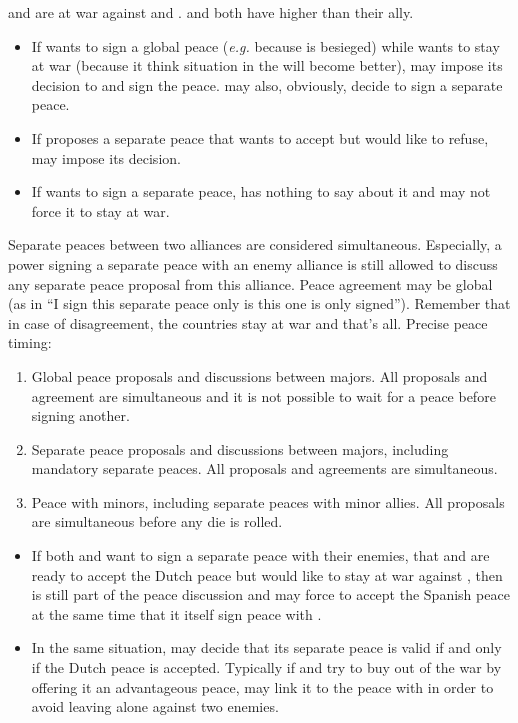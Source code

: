 \begin{exemple}[Disagreements]
  \FRA and \SPA are at war against \HOL and \ANG. \FRA and  \HOL both have
  higher \DIP than their ally.
  \begin{itemize}
  \item If \HOL wants to sign a global peace (\emph{e.g.} because
    \villeAmsterdam is besieged) while \ANG wants to stay at war (because it
    think situation in the \ROTW will become better), \HOL may impose its
    decision to \ANG and sign the peace. \HOL may also, obviously, decide to
    sign a separate peace.
  \item If \HOL proposes a separate peace that \FRA wants to accept but \HIS
    would like to refuse, \FRA may impose its decision.
  \item If \ANG wants to sign a separate peace, \HOL has nothing to say about
    it and may not force it to stay at war.
  \end{itemize}
\end{exemple}

Separate peaces between two alliances are considered simultaneous. Especially,
a power signing a separate peace with an enemy alliance is still allowed to
discuss any separate peace proposal from this alliance. Peace agreement may be
global (as in ``I sign this separate peace only is this one is only
signed''). Remember that in case of disagreement, the countries stay at war
and that's all.
\bparag Precise peace timing:
\begin{enumerate}
\item Global peace proposals and discussions between majors. All proposals and
  agreement are simultaneous and it is not possible to wait for a peace before
  signing another.
\item Separate peace proposals and discussions between majors, including
  mandatory separate peaces. All proposals and agreements are simultaneous.
\item Peace with minors, including separate peaces with minor allies. All
  proposals are simultaneous before any die is rolled.
\end{enumerate}

\begin{exemple}
  \begin{itemize}
  \item If both \HOL and \HIS want to sign a separate peace with their
    enemies, that \FRA and \HIS are ready to accept the Dutch peace but \ANG
    would like to stay at war against \HIS, then \HOL is still part of the
    peace discussion and may force \ANG to accept the Spanish peace at the
    same time that it itself sign peace with \FRA.
  \item In the same situation, \HIS may decide that its separate peace is
    valid if and only if the Dutch peace is accepted. Typically if \ANG and
    \HOL try to buy \HIS out of the war by offering it an advantageous peace,
    \HIS may link it to the peace with \HOL in order to avoid leaving \FRA
    alone against two enemies.
  \end{itemize}
\end{exemple}


